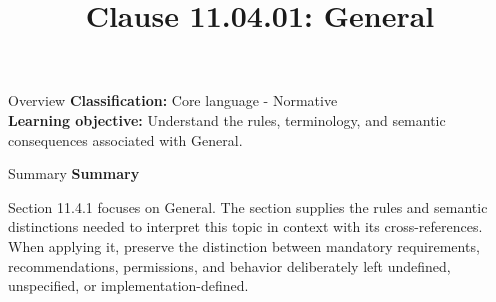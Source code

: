 \documentclass[10pt,letterpaper]{article}
\title{Clause 11.04.01: General}
\author{}
\date{}
\begin{document}
\maketitle
\begin{CornellOverviewBox}{Overview}
\textbf{Classification:} Core language - Normative\\[2pt]
\textbf{Learning objective:} Understand the rules, terminology, and semantic consequences associated with General.
\end{CornellOverviewBox}\begin{CornellSummaryBox}{Summary}
{\sffamily\bfseries\color{Accent} Summary}\par\vspace{3pt}Section 11.4.1 focuses on General. The section supplies the rules and semantic distinctions needed to interpret this topic in context with its cross-references. When applying it, preserve the distinction between mandatory requirements, recommendations, permissions, and behavior deliberately left undefined, unspecified, or implementation-defined.
\end{CornellSummaryBox}
\end{document}
